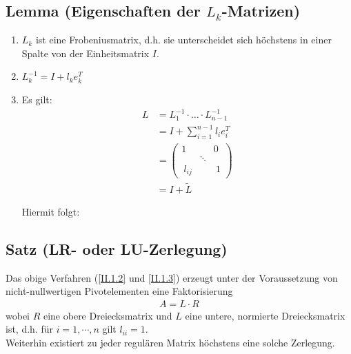 \documentclass[ngerman,fontsize=11pt, paper=a4, parskip=half, titlepage=true, toc=bib]{scrbook}
\begin{document}
\subsection{Lemma (Eigenschaften der $L_k$-Matrizen)} \label{2.1.12} 
\begin{enumerate}[1.]
	\item $L_k$ ist eine Frobeniusmatrix, d.h. sie unterscheidet sich höchstens
			 in einer Spalte von der Einheitsmatrix $I$.
	\item $L_k^{-1} = I + l_ke_{k}^T$
	\item Es gilt:
			\begin{align}
				L &= L_1^{-1} \cdot \dotsc \cdot L_{n-1}^{-1}  
				\label{II.1.13}
				\\ \nonumber
					& = I + \sum_{i=1}^{n-1} l_i e_i^T \\ \nonumber
					&= \begin{pmatrix}
						1 && 0 ~ \\
						&\ddots& \\
						~l_{ij} && ~1
					\end{pmatrix} \\ \nonumber
					&= I+ \widetilde{L}
			\end{align}
			
			Hiermit folgt: 
\end{enumerate}

\subsection{Satz (LR- oder LU-Zerlegung)} 
Das obige Verfahren (\eqref{II.1.2} und \eqref{II.1.3}) erzeugt unter der Voraussetzung
von nicht-nullwertigen Pivotelementen eine Faktorisierung
\begin{align*}
	A= L\cdot R 
\end{align*}
wobei $R$ eine obere Dreiecksmatrix und $L$ eine untere, normierte Dreiecksmatrix ist,
d.h. für $i=1, \cdots , n$ gilt $l_{ii}= 1$. \\
Weiterhin existiert zu jeder regulären Matrix höchstens eine solche Zerlegung.
\end{document}
